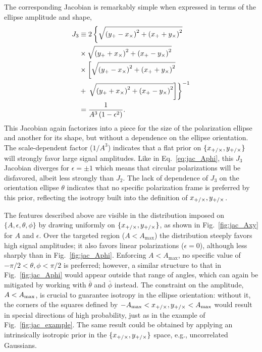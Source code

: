 \documentclass[aps,prd,twocolumn,superscriptaddress,preprintnumbers,floatfix,nofootinbib]{revtex4-2}
\newcommand*{\eq}[1]{Eq.~\eqref{eq:#1}}
\begin{document}
The corresponding Jacobian is remarkably simple when expressed in terms of the ellipse amplitude and shape,
\begin{subequations} \label{eq:jac_Aeps_Axy}
\begin{align}
J_3 &\equiv 2 \left\{\sqrt{\left(y_{+} -x_{\times} \right)^2 +\left(x_{+} +y_{\times}\right)^2}
\right. \nonumber \\
&\times \sqrt{\left(y_{+} + x_{\times}\right)^2 + \left(x_{+} - y_{\times}\right)^2}  \nonumber\\
&\times \left[ \sqrt{\left(y_{+} -x_{\times} \right)^2 +\left(x_{+} +y_{\times}\right)^2} \right.  \nonumber\\
&+ \left.\left. \sqrt{\left(y_{+} + x_{\times}\right)^2 + \left(x_{+} - y_{\times}\right)^2} \right]\right\}^{-1} \\
&= \frac{1}{A^{3} \left(1 - \epsilon^2\right)}  .
\end{align}
\end{subequations}
This Jacobian again factorizes into a piece for the size of the polarization ellipse and another for its shape, but without a dependence on the ellipse orientation.
The scale-dependent factor ($1/A^3$) indicates that a flat prior on $\{x_{+/\times},y_{+/\times}\}$ will strongly favor large signal amplitudes.
Like in \eq{jac_Aphi}, this $J_3$ Jacobian diverges for $\epsilon = \pm 1$ which means that circular polarizations will be disfavored, albeit less strongly than $J_2$.
The lack of dependence of $J_3$ on the orientation ellipse $\theta$ indicates that no specific polarization frame is preferred by this prior, reflecting the isotropy built into the definition of $x_{+/\times}, y_{+/\times}$.

The features described above are visible in the distribution imposed on $\{A,\epsilon,\theta,\phi\}$ by drawing uniformly on $\{x_{+/\times}, y_{+/\times}\}$, as shown in Fig.~\ref{fig:jac_Axy} for $A$ and $\epsilon$.
Over the targeted region ($A < A_{\max}$) the distribution steeply favors high signal amplitudes; it also favors linear polarizations ($\epsilon = 0$), although less sharply than in Fig.~\ref{fig:jac_Aphi}.
Enforcing $A < A_{\max}$, no specific value of $-\pi/2 < \theta, \phi < \pi/2$ is preferred; however, a similar structure to that in Fig.~\ref{fig:jac_Aphi} would appear outside that range of angles, which can again be mitigated by working with $\bar{\theta}$ and $\bar{\phi}$ instead.
The constraint on the amplitude, $A < A_{\rm max}$, is crucial to guarantee isotropy in the ellipse orientation: without it, the corners of the squares defined by $-A_{\max} < x_{+/\times},y_{+/\times} < A_{\max}$ would result in special directions of high probability, just as in the example of Fig.~\ref{fig:jac_example}.
The same result could be obtained by applying an intrinsically isotropic prior in the $\{x_{+/\times}, y_{+/\times}\}$ space, e.g., uncorrelated Gaussians.
\end{document}
